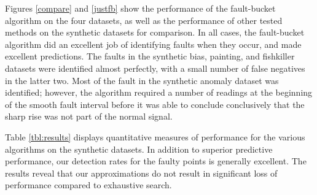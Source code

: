 \documentclass{article}
\begin{document}


Figures \ref{compare} and \ref{justfb} show the performance of the
fault-bucket algorithm on the four datasets, as well as the
performance of other tested methods on the synthetic datasets for
comparison.  In all cases, the fault-bucket algorithm did an excellent
job of identifying faults when they occur, and made excellent
predictions.  The faults in the synthetic bias, painting,
and fishkiller datasets were identified almost perfectly, with a small
number of false negatives in the latter two.  Most of the fault in the
synthetic anomaly dataset was identified; however, the algorithm
required a number of readings at the beginning of the smooth fault
interval before it was able to conclude conclusively that the sharp
rise was not part of the normal signal.

Table \ref{tbl:results} displays quantitative measures of performance
for the various algorithms on the synthetic
datasets.  
In addition to superior predictive performance, our
detection rates for the faulty points is generally excellent. The results reveal that our approximations do not result in significant loss of performance compared to exhaustive search.
\end{document}
